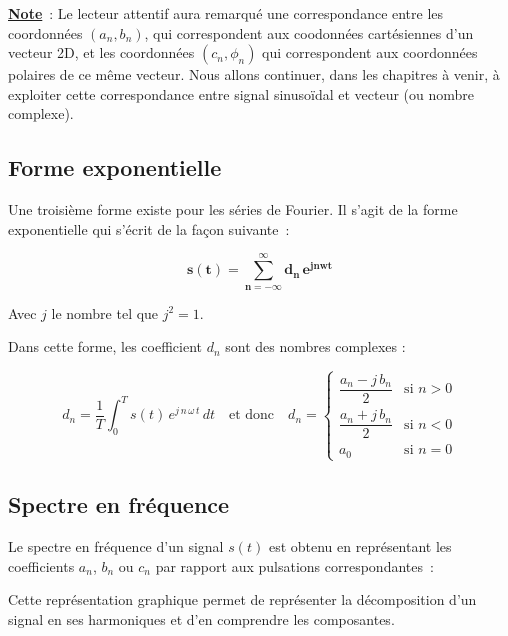 \textbf{\underline{Note}}~: Le lecteur attentif aura remarqué une correspondance entre les coordonnées $(a_n,b_n)$, qui correspondent aux coodonnées cartésiennes d'un vecteur 2D, et les coordonnées $(c_n, \phi_n)$ qui correspondent aux coordonnées polaires de ce même vecteur. Nous allons continuer, dans les chapitres à venir, à exploiter cette correspondance entre signal sinusoïdal et vecteur (ou nombre complexe).

\subsection*{Forme exponentielle}

Une troisième forme existe pour les séries de Fourier. Il s'agit de la forme exponentielle qui s'écrit de la façon suivante~:

\begin{equation}
\bm{s(t) = \sum_{n=-\infty}^{\infty} d_n\,e^{jnwt} }
\end{equation}

Avec $j$ le nombre tel que $j^2=1$.

Dans cette forme, les coefficient $d_n$ sont des nombres complexes :

$$ d_n = \dfrac{1}{T} \int_{0}^{T} s(t)\,e^{ j\,n\,\omega\,t }\,dt \quad  \text{et donc} \quad d_n = 
\begin{cases} 
	\dfrac{a_n - j\,b_n}{2} & \text{si } n>0 \\
	\dfrac{a_n + j\,b_n}{2} & \text{si } n<0 \\
	a_0 & \text{si } n=0
\end{cases}
$$  

\subsection*{Spectre en fréquence }

Le spectre en fréquence d'un signal $s(t)$ est obtenu en représentant les coefficients $a_n$, $b_n$ ou $c_n$ par rapport aux pulsations correspondantes~: \\

\begin{center}

\end{center}

Cette représentation graphique permet de représenter la décomposition d'un signal en ses harmoniques et d'en comprendre les composantes. \\


